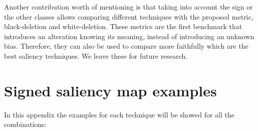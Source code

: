 \documentclass[preprint,12pt]{elsarticle}
\begin{document}
Another contribution worth of mentioning is that taking into account the sign or the other classes allows comparing different techniques with the proposed metric, black-deletion and white-deletion. These metrics are the first benchmark that introduces an alteration knowing its meaning, instead of introducing an unknown bias. Therefore, they can also be used to compare more faithfully which are the best saliency techniques. We leave these for future research.


 
{\small}

\appendix

\section{Signed saliency map examples}
\label{sec:signed saliency map examples}
In this appendix the examples for each technique will be showed for all the combinations:

  
  
  
\end{document}
